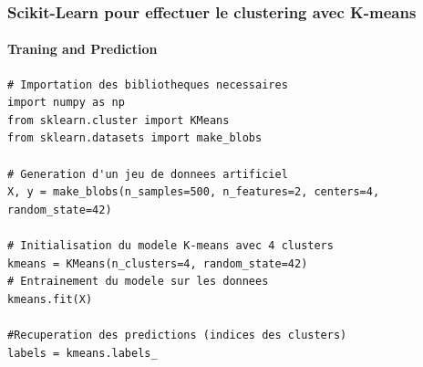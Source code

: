 \documentclass{beamer}
\begin{document}
\begin{frame}[fragile]
	\frametitle{Scikit-Learn pour effectuer le clustering avec K-means}
\framesubtitle{Traning and Prediction}
	\begin{lstlisting}
# Importation des bibliotheques necessaires
import numpy as np
from sklearn.cluster import KMeans
from sklearn.datasets import make_blobs

# Generation d'un jeu de donnees artificiel
X, y = make_blobs(n_samples=500, n_features=2, centers=4, random_state=42)
	
# Initialisation du modele K-means avec 4 clusters
kmeans = KMeans(n_clusters=4, random_state=42)	
# Entrainement du modele sur les donnees
kmeans.fit(X)
		
#Recuperation des predictions (indices des clusters)
labels = kmeans.labels_	
	\end{lstlisting}
\end{frame}
\end{document}
